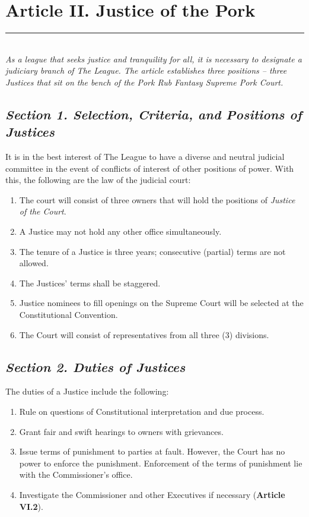 \documentclass{article}
\begin{document}
\section{Article II. Justice of the Pork}
    \noindent\rule{\textwidth}{0.5pt}\\

    \noindent\textit{As a league that seeks justice and tranquility for all, it is necessary to designate a judiciary branch of The League. The article establishes three positions – three Justices that sit on the bench of the Pork Rub Fantasy Supreme Pork Court.}
    \subsection{\textit{Section 1. Selection, Criteria, and Positions of Justices}}
    It is in the best interest of The League to have a diverse and neutral judicial committee in the event of conflicts of interest of other positions of power. With this, the following are the law of the judicial court:
    \begin{enumerate}[label=\Alph*)]
        \item The court will consist of three owners that will hold the positions of \textit{Justice of the Court}.
        \item A Justice may not hold any other office simultaneously.
        \item The tenure of a Justice is three years; consecutive (partial) terms are not allowed.
        \item The Justices’ terms shall be staggered.
        \item Justice nominees to fill openings on the Supreme Court will be selected at the Constitutional Convention.
        \item The Court will consist of representatives from all three (3) divisions.
    \end{enumerate}
    \subsection{\textit{Section 2. Duties of Justices}}
    The duties of a Justice include the following:
    \begin{enumerate}[label=\Alph*)]
        \item Rule on questions of Constitutional interpretation and due process.
        \item Grant fair and swift hearings to owners with grievances.
        \item Issue terms of punishment to parties at fault. However, the Court has no power to enforce the punishment. Enforcement of the terms of punishment lie with the Commissioner’s office.
        \item Investigate the Commissioner and other Executives if necessary (\textbf{Article VI.2}).
    \end{enumerate}
\end{document}

